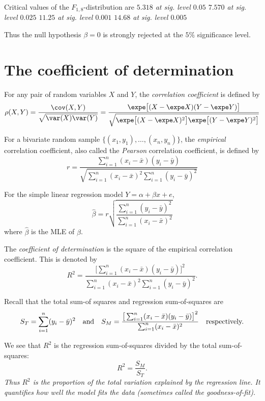 \begin{solution}
Critical values of the $F_{1,8}$-distribution are
\bit
\it $5.318$ at sig. level $0.05$
\it $7.570$ at sig. level $0.025$
\it $11.25$ at sig. level $0.001$
\it $14.68$ at sig. level $0.005$
\eit

\vspace*{2ex}
Thus the null hypothesis ${\beta} = 0$ is strongly rejected at the $5\%$ significance level.
\end{solution}


\section{The coefficient of determination}
For any pair of random variables $X$ and $Y$, the \emph{correlation coefficient} is defined by
%
\[
\rho(X,Y) 
	= \frac{\cov(X,Y)}{\sqrt{\var(X)\var(Y)}}
	= \frac{\expe\big[(X-\expe X)(Y-\expe Y)\big]}
			{\sqrt{\expe\big[(X-\expe X)^2\big]\expe\big[(Y-\expe Y)^2\big]}}
\]

For a bivariate random sample $\{(x_1,y_1),\ldots,(x_n,y_n)\}$, the \emph{empirical} correlation coefficient, also called the \emph{Pearson} correlation coefficient, is defined by
\[
r = \frac{\sum_{i=1}^n(x_i-\bar{x})(y_i - \bar{y})}{\sqrt{\sum_{i=1}^n(x_i-\bar{x})^2\sum_{i=1}^n(y_i-\bar{y})^2}} 
\]

For the simple linear regression model $Y=\alpha+\beta x + e$,
\[
\hat{\beta} = r\sqrt{\frac{\sum_{i=1}^n(y_i-\bar{y})^2}{\sum_{i=1}^n(x_i-\bar{x})^2}}
\]
where $\hat{\beta}$ is the MLE of $\beta$.


The \emph{coefficient of determination} is the square of the empirical correlation coefficient. This is denoted by
\[
R^2 = \frac{\big[\sum_{i=1}^n(x_i-\bar{x})(y_i - \bar{y})\big]^2}{\sum_{i=1}^n(x_i-\bar{x})^2\sum_{i=1}^n(y_i-\bar{y})^2}. 
\]

\vspace*{2ex}
Recall that the total sum-of squares and regression sum-of-squares are
\[
S_T	= \displaystyle\sum_{i=1}^n (y_i-\bar{y})^2
\text{\quad and\quad}
S_M = \frac{\big[\sum_{i=1}^n (x_i-\bar{x})(y_i-\bar{y})\big]^2}{\sum_{i=1}^n (x_i-\bar{x})^2}
\text{\quad respectively.}
\]

\vspace*{2ex}
We see that $R^2$ is the regression sum-of-squares divided by the total sum-of-squares:
\[
R^2 = \frac{S_M}{S_T}.
\]
\bit
\it Thus $R^2$ is the proportion of the total variation explained by the regression line.
\it It quantifies how well the model fits the data (sometimes called the \emph{goodness-of-fit}).
\eit


\stopcontents[chapters]
\endinput
